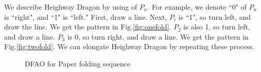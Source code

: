 \documentclass[runningheads,a4]{llncs}
\begin{document}
We describe Heighway Dragon by using of $P_n$.
For example, we denote ``0" of $P_n$ is ``right", and ``1" is ``left."
First, draw a line.
Next, $P_i$ is ``1", so turn left, and draw the line.
We get the pattern in Fig.\ref{fig:onefold}.
$P_2$ is also 1, so turn left, and draw a line.
$P_3$ is 0, so turn right, and draw a line.
We get the pattern in Fig.\ref{fig:twofold}.
We can elongate Heighway Dragon by repeating these process.
\begin{figure}[h]
  	\centering
\caption{DFAO for Paper folding sequence\cite{automatic}}
\label{fig:pdfao}
\end{figure}


\end{document}

